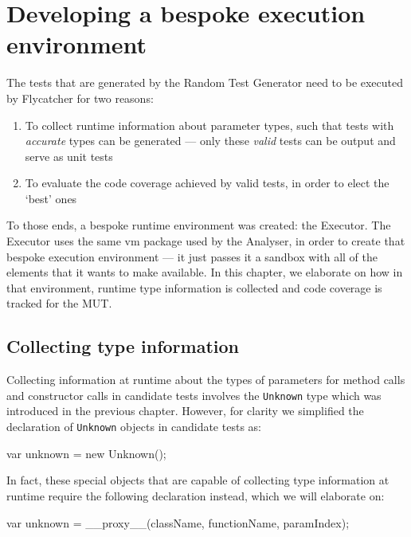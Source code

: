 \chapter{Developing a bespoke execution environment}
The tests that are generated by the \textsf{Random Test Generator} need to be executed by \textsf{Flycatcher} for two reasons:

\begin{enumerate}
   \item To collect runtime information about parameter types, such that tests with \emph{accurate} types can be generated --- only these \emph{valid} tests can be output and serve as unit tests
   \item To evaluate the code coverage achieved by valid tests, in order to elect the `best' ones
\end{enumerate}

To those ends, a bespoke runtime environment was created: the \textsf{Executor}. The \textsf{Executor} uses the same \textsf{vm} package used by the \textsf{Analyser}, in order to create that bespoke execution environment --- it just passes it a sandbox with all of the elements that it wants to make available. In this chapter, we elaborate on how in that environment, runtime type information is collected and code coverage is tracked for the MUT.


\section{Collecting type information}
Collecting information at runtime about the types of parameters for method calls and constructor calls in candidate tests involves the \texttt{Unknown} type which was introduced in the previous chapter. However, for clarity we simplified the declaration of \texttt{Unknown} objects in candidate tests as:

\begin{code}
var unknown = new Unknown();
\end{code}

\noindent In fact, these special objects that are capable of collecting type information at runtime require the following declaration instead, which we will elaborate on:

\begin{code}
var unknown = __proxy__(className, functionName, paramIndex);
\end{code}

